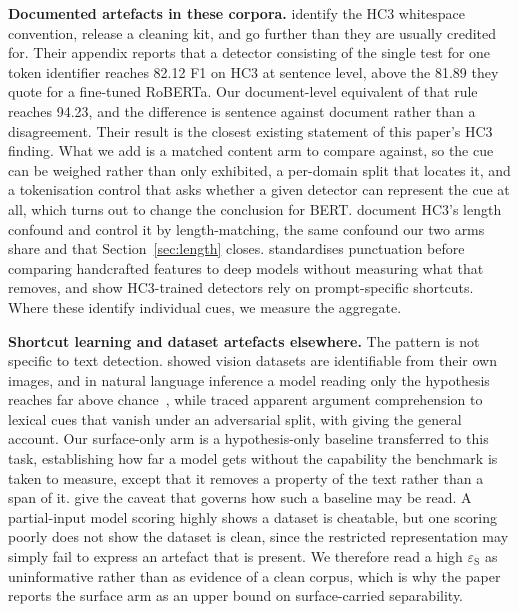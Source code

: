 \documentclass[conference,a4paper]{IEEEtran}
\begin{document}
\textbf{Documented artefacts in these corpora.} \citet{Tian2023multiscale} identify the HC3 whitespace convention, release a cleaning kit, and go further than they are usually credited for. Their appendix reports that a detector consisting of the single test for one token identifier reaches 82.12 F1 on HC3 at sentence level, above the 81.89 they quote for a fine-tuned RoBERTa. Our document-level equivalent of that rule reaches 94.23, and the difference is sentence against document rather than a disagreement. Their result is the closest existing statement of this paper's HC3 finding. What we add is a matched content arm to compare against, so the cue can be weighed rather than only exhibited, a per-domain split that locates it, and a tokenisation control that asks whether a given detector can represent the cue at all, which turns out to change the conclusion for BERT. \citet{Baidya2026detecting} document HC3's length confound and control it by length-matching, the same confound our two arms share and that Section~\ref{sec:length} closes. \citet{Ardeshirifar2025comparing} standardises punctuation before comparing handcrafted features to deep models without measuring what that removes, and \citet{Park2024investigating} show HC3-trained detectors rely on prompt-specific shortcuts. Where these identify individual cues, we measure the aggregate.

\textbf{Shortcut learning and dataset artefacts elsewhere.} The pattern is not specific to text detection. \citet{Torralba2011unbiased} showed vision datasets are identifiable from their own images, and in natural language inference a model reading only the hypothesis reaches far above chance~\cite{Gururangan2018annotation,Poliak2018hypothesis}, while \citet{Niven2019probing} traced apparent argument comprehension to lexical cues that vanish under an adversarial split, with \citet{Geirhos2020shortcut} giving the general account. Our surface-only arm is a hypothesis-only baseline transferred to this task, establishing how far a model gets without the capability the benchmark is taken to measure, except that it removes a property of the text rather than a span of it. \citet{Feng2019misleading} give the caveat that governs how such a baseline may be read. A partial-input model scoring highly shows a dataset is cheatable, but one scoring poorly does not show the dataset is clean, since the restricted representation may simply fail to express an artefact that is present. We therefore read a high $\varepsilon_{\mathrm{S}}$ as uninformative rather than as evidence of a clean corpus, which is why the paper reports the surface arm as an upper bound on surface-carried separability.
\end{document}
